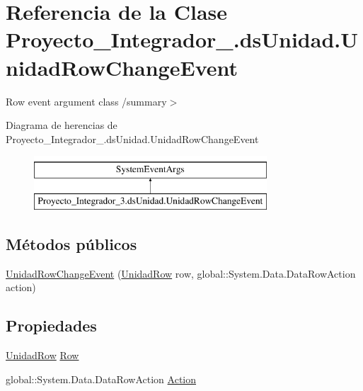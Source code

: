 \hypertarget{class_proyecto___integrador__3_1_1ds_unidad_1_1_unidad_row_change_event}{\section{Referencia de la Clase Proyecto\-\_\-\-Integrador\-\_.\-ds\-Unidad.\-Unidad\-Row\-Change\-Event}
\label{class_proyecto___integrador__3_1_1ds_unidad_1_1_unidad_row_change_event}
}


Row event argument class /summary$>$  


Diagrama de herencias de Proyecto\-\_\-\-Integrador\-\_.\-ds\-Unidad.\-Unidad\-Row\-Change\-Event\begin{figure}[H]
\begin{center}
\leavevmode
\includegraphics[height=2.000000cm]{class_proyecto___integrador__3_1_1ds_unidad_1_1_unidad_row_change_event}
\end{center}
\end{figure}
\subsection*{Métodos públicos}
\begin{DoxyCompactItemize}
\item 
\hyperlink{class_proyecto___integrador__3_1_1ds_unidad_1_1_unidad_row_change_event_a983286d7404a2282f261e7688b4e6381}{Unidad\-Row\-Change\-Event} (\hyperlink{class_proyecto___integrador__3_1_1ds_unidad_1_1_unidad_row}{Unidad\-Row} row, global\-::\-System.\-Data.\-Data\-Row\-Action action)
\end{DoxyCompactItemize}
\subsection*{Propiedades}
\begin{DoxyCompactItemize}
\item 
\hyperlink{class_proyecto___integrador__3_1_1ds_unidad_1_1_unidad_row}{Unidad\-Row} \hyperlink{class_proyecto___integrador__3_1_1ds_unidad_1_1_unidad_row_change_event_a0eb95b09cacaa2e7b7d252f9b999294e}{Row}
\item 
global\-::\-System.\-Data.\-Data\-Row\-Action \hyperlink{class_proyecto___integrador__3_1_1ds_unidad_1_1_unidad_row_change_event_a326a7a9bbe63c16a3ee916456873039e}{Action}
\end{DoxyCompactItemize}
